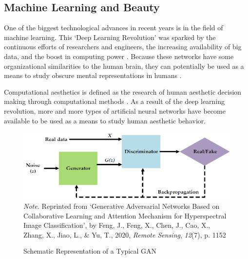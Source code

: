 \documentclass[../main.tex]{subfiles}
\begin{document}
\subsection{Machine Learning and Beauty}
One of the biggest technological advances in recent years is in the field of machine learning. This `Deep Learning Revolution' was sparked by the continuous efforts of researchers and engineers, the increasing availability of big data, and the boost in computing power \parencite{sejnowskiDeepLearningRevolution2018}. Because these networks have some organizational similarities to the human brain, they can potentially be used as a means to study obscure mental representations in humans \parencite{guoDeepLearningVisual2016, goetschalckx2021generative}. 

Computational aesthetics is defined as the research of human aesthetic decision making through computational methods \parencite{valenziseAdvancesChallengesComputational2022, hoenig2005proceedings}. As a result of the deep learning revolution, more and more types of artificial neural networks have become available to be used as a means to study human aesthetic behavior.

\begin{figure}[!h]
	\caption{Schematic Representation of a Typical GAN}
	\label{fig:gan-simple}
	\includegraphics[width=1\linewidth]{images/gan_simple}
	{\textit{Note.} Reprinted from `Generative Adversarial Networks Based on Collaborative Learning and Attention Mechanism for Hyperspectral Image Classification', by Feng, J., Feng, X., Chen, J., Cao, X., Zhang, X., Jiao, L., \& Yu, T., 2020, \textit{Remote Sensing}, \textit{12}(7), p. 1152}
\end{figure}
\end{document}
